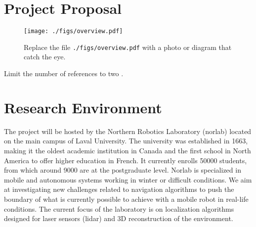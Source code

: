 \documentclass[10pt,letterpaper,oneside]{article}
\author{Fran\c{c}ois Pomerleau \\
       Laval University\\
       1065, av. de la Médecine \\
       Quebec, Qc \\
       Canada G1V 0A6 \\
       \texttt{<francois.pomerleau@ift.ulaval.ca>}
}
\begin{document}
\makeCustomTitle

\section*{Project Proposal}

\begin{wrapfigure}{R}{0.35\textwidth}
\centering
\texttt{[image: ./figs/overview.pdf]}
\caption{
Replace the file \texttt{./figs/overview.pdf} with a photo or diagram that catch the eye.
}
\label{fig:overview}
\end{wrapfigure}

Limit the number of references to two \cite{Pomerleau2013,Pomerleau2014}.
\lightlipsum[1-2]

\section*{Research Environment}

The project will be hosted by the Northern Robotics Laboratory (norlab) located on the main campus of Laval University.
The university was established in \num{1663}, making it the oldest academic institution in Canada and the first school in North America to offer higher education in French.
It currently enrolls \num{50000} students, from which around \num{9000} are at the postgraduate level.
Norlab is specialized in mobile and autonomous systems working in winter or difficult conditions. 
We aim at investigating new challenges related to navigation algorithms to push the boundary of what is currently possible to achieve with a mobile robot in real-life conditions. 
The current focus of the laboratory is on localization algorithms designed for laser sensors (lidar) and 3D reconstruction of the environment.

\printbibliography
\end{document}
